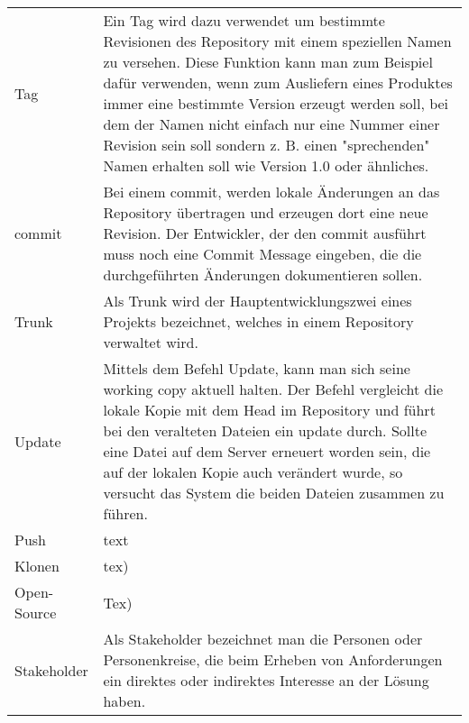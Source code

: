 \begin{center}
\begin{longtable}{lp{11cm}}
Tag & Ein Tag wird dazu verwendet um bestimmte Revisionen des Repository mit einem speziellen Namen zu versehen. Diese Funktion kann man zum Beispiel dafür verwenden, wenn zum Ausliefern eines Produktes immer eine bestimmte Version erzeugt werden soll, bei dem der Namen nicht einfach nur eine Nummer einer Revision sein soll sondern z. B. einen "sprechenden" Namen erhalten soll wie Version 1.0 oder ähnliches. \\

commit & Bei einem commit, werden lokale Änderungen an das Repository übertragen und erzeugen dort eine neue Revision. Der Entwickler, der den commit ausführt muss noch eine Commit Message eingeben, die die durchgeführten Änderungen dokumentieren sollen. \\

Trunk & Als Trunk wird der Hauptentwicklungszwei eines Projekts bezeichnet, welches in einem Repository verwaltet wird. \\

Update & Mittels dem Befehl Update, kann man sich seine working copy aktuell halten. Der Befehl vergleicht die lokale Kopie mit dem Head im Repository und führt bei den veralteten Dateien ein update durch. Sollte eine Datei auf dem Server erneuert worden sein, die auf der lokalen Kopie auch verändert wurde, so versucht das System die beiden Dateien zusammen zu führen. \\

Push & text \\

Klonen & tex) \\

Open-Source & Tex) \\

Stakeholder & Als Stakeholder bezeichnet man die Personen oder Personenkreise, die beim Erheben von Anforderungen ein direktes oder indirektes Interesse an der Lösung haben.  
\end{longtable}
\end{center}